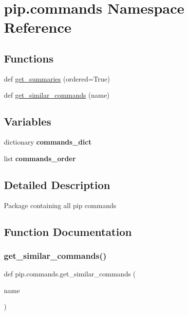 \hypertarget{namespacepip_1_1commands}{}\section{pip.\+commands Namespace Reference}
\label{namespacepip_1_1commands}
\subsection*{Functions}
\begin{DoxyCompactItemize}
\item 
def \hyperlink{namespacepip_1_1commands_ae39a8b6d0749edb37df29219a2225246}{get\+\_\+summaries} (ordered=True)
\item 
def \hyperlink{namespacepip_1_1commands_aa808d9413492b934afbb388391441a83}{get\+\_\+similar\+\_\+commands} (name)
\end{DoxyCompactItemize}
\subsection*{Variables}
\begin{DoxyCompactItemize}
\item 
dictionary {\bfseries commands\+\_\+dict}
\item 
list {\bfseries commands\+\_\+order}
\end{DoxyCompactItemize}


\subsection{Detailed Description}
\begin{DoxyVerb}Package containing all pip commands
\end{DoxyVerb}
 

\subsection{Function Documentation}
\mbox{\label{namespacepip_1_1commands_aa808d9413492b934afbb388391441a83}} 
\subsubsection{\texorpdfstring{get\+\_\+similar\+\_\+commands()}{get\_similar\_commands()}}
{\footnotesize\ttfamily def pip.\+commands.\+get\+\_\+similar\+\_\+commands (\begin{DoxyParamCaption}\item[{}]{name }\end{DoxyParamCaption})}

